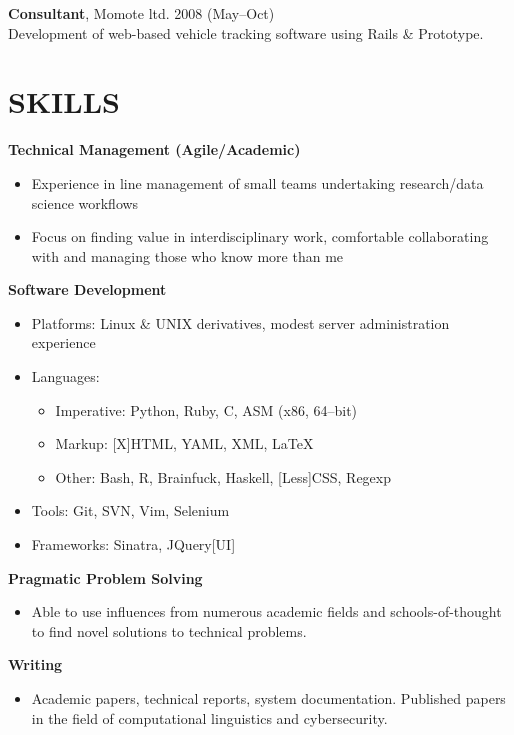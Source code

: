 \documentclass{res}
\begin{document}
\begin{resume}
    {\bf Consultant},
    Momote ltd.
    2008 (May--Oct)\\
    Development of web-based vehicle tracking software using Rails \& Prototype.




\section{SKILLS}
\vspace{0.1in}

   {\bf Technical Management (Agile/Academic)}
   \begin{itemize}
        \item Experience in line management of small teams undertaking research/data science workflows
        \item Focus on finding value in interdisciplinary work, comfortable collaborating with and managing those who know more than me
   \end{itemize}

   {\bf Software Development}
        \begin{itemize}
            \item[] Platforms: Linux \& UNIX derivatives, modest server administration experience
            \item[] Languages:
                \begin{itemize}
                    \item Imperative: Python, Ruby, C, ASM (x86, 64--bit)
                    \item Markup: [X]HTML, YAML, XML, \LaTeX
                    \item Other: Bash, R, Brainfuck, Haskell, [Less]CSS, Regexp
                \end{itemize}
            \item[] Tools: Git, SVN, Vim, Selenium
            \item[] Frameworks: Sinatra, JQuery[UI]
        \end{itemize}

  {\bf Pragmatic Problem Solving}
    \begin{itemize}
      \item[] Able to use influences from numerous academic fields and schools-of-thought to find novel solutions to technical problems.
      \end{itemize}

  {\bf Writing}
    \begin{itemize} %
      \item[] Academic papers, technical reports, system documentation.
        Published papers in the field of computational linguistics and cybersecurity.
      \end{itemize}


\end{resume}
\end{document}
